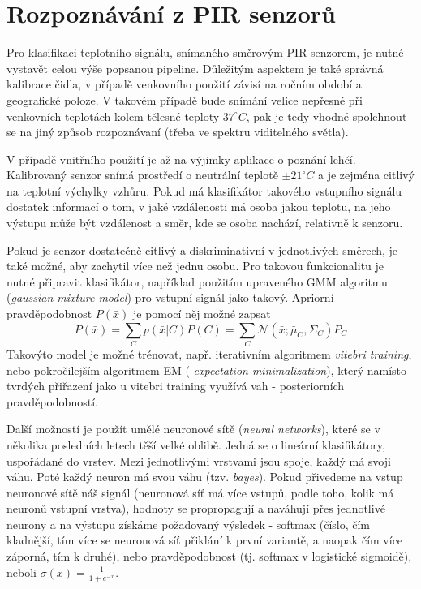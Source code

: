   \section{Rozpoznávání z PIR senzorů}
  Pro klasifikaci teplotního signálu, snímaného směrovým PIR senzorem, je nutné vystavět celou
  výše popsanou pipeline. Důležitým aspektem je také správná kalibrace čidla, v případě venkovního
  použití závisí na ročním období a geografické poloze. V takovém případě bude snímání velice nepřesné
  při venkovních teplotách kolem tělesné teploty $37^{\circ}C$, pak je tedy vhodné
  spolehnout se na jiný způsob rozpoznávaní (třeba ve spektru viditelného světla).

  V případě vnitřního použití je až na výjimky aplikace o poznání lehčí. Kalibrovaný senzor snímá prostředí
  o neutrální teplotě $\pm 21^{\circ}C$ a je zejména citlivý na teplotní výchylky vzhůru.
  Pokud má klasifikátor takového vstupního signálu dostatek informací o tom, v jaké vzdálenosti má
  osoba jakou teplotu, na jeho výstupu může být vzdálenost a směr, kde se osoba nachází, relativně k senzoru.

  Pokud je senzor dostatečně citlivý a diskriminativní v jednotlivých směrech, je také možné, aby zachytil
  více než jednu osobu. Pro takovou funkcionalitu je nutné připravit klasifikátor, například použitím
  upraveného GMM algoritmu ({\it gaussian mixture model}) pro vstupní signál jako takový. Apriorní
  pravděpodobnost $P(\bar{x})$ je pomocí něj možné zapsat $$P(\bar{x}) = \sum_{C} p(\bar{x} | C)
  P(C) = \sum_{C} \mathcal{N}(\bar{x}; \bar{\mu}_C,\Sigma_C) P_C$$ Takovýto model je možné trénovat,
  např. iterativním algoritmem {\it vitebri training}, nebo pokročilejším algoritmem EM ({\it
  expectation minimalization}), který namísto tvrdých přiřazení jako u vitebri training využívá vah
  - posteriorních pravděpodobností.

  Další možností je použít umělé neuronové sítě ({\it neural networks}), které se v několika posledních
  letech těší velké oblibě. Jedná se o lineární klasifikátory, uspořádané do vrstev. Mezi jednotlivými
  vrstvami jsou spoje, každý má svoji váhu. Poté každý neuron má svou váhu (tzv. {\it bayes}). Pokud
  přivedeme na vstup neuronové sítě náš signál (neuronová síť má více vstupů, podle toho, kolik má
  neuronů vstupní vrstva), hodnoty se propropagují a naváhují přes jednotlivé neurony a na výstupu
  získáme požadovaný výsledek - softmax (číslo, čím kladnější, tím více se neuronová síť přiklání
  k první variantě, a naopak čím více záporná, tím k druhé), nebo pravděpodobnost (tj. softmax v
  logistické sigmoidě), neboli $\sigma(x) = \frac{1}{1 + e^{-x}}$.


